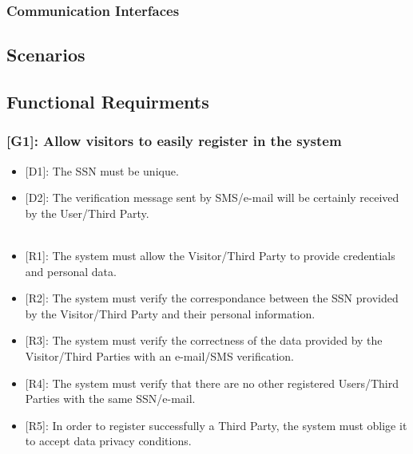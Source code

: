 \documentclass[12pt,a4paper]{article}
\begin{document}
			\subsubsection{Communication Interfaces}
			
		\subsection{Scenarios}
			
	\newpage
	
	\subsection{Functional Requirments}
		
		\subsubsection*{{[}{G1}{]}: Allow visitors to easily register in the system}
			\begin{itemize}
				\begin{itemize}
					\item {[D1]}: The SSN must be unique.
					\item {[D2]}: The verification message sent by SMS/e-mail will be certainly received by the User/Third Party.
					\\\\
					\item {[R1]}: The system must allow the Visitor/Third Party to provide credentials and personal data.
					\item {[R2]}: The system must verify the correspondance between the SSN provided by the Visitor/Third Party and their personal information.
					\item {[R3]}: The system must verify the correctness of the data provided by the Visitor/Third Parties with an e-mail/SMS verification.
					\item {[R4]}: The system must verify that there are no other registered Users/Third Parties with the same SSN/e-mail.
					\item {[R5]}: In order to register successfully a Third Party, the system must oblige it to accept data privacy conditions.
				\end{itemize} 
			\end{itemize}
\end{document}
